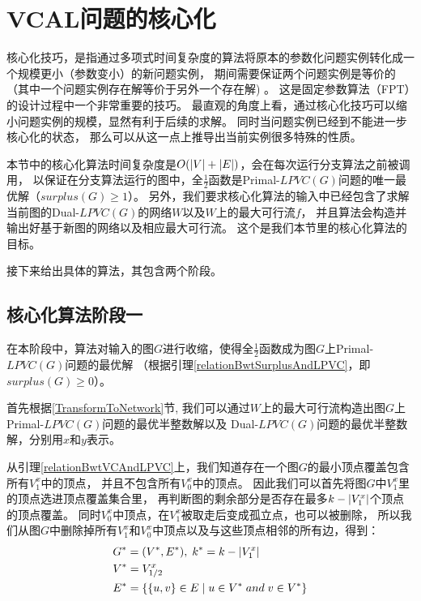 

\section{VCAL问题的核心化} \label{KerneliseAlgorithm}
核心化技巧，是指通过多项式时间复杂度的算法将原本的参数化问题实例转化成一个规模更小（参数变小）的新问题实例，
期间需要保证两个问题实例是等价的（其中一个问题实例存在解等价于另外一个存在解) 。
这是固定参数算法（FPT）的设计过程中一个非常重要的技巧。
最直观的角度上看，通过核心化技巧可以缩小问题实例的规模，显然有利于后续的求解。
同时当问题实例已经到不能进一步核心化的状态，
那么可以从这一点上推导出当前实例很多特殊的性质。

本节中的核心化算法时间复杂度是$O(\left\vert V \right\vert + \left\vert E \right\vert)$，会在每次运行分支算法之前被调用，
以保证在分支算法运行的图中，全$\frac{1}{2}$函数是Primal-$LPVC(G)$问题的唯一最优解（$surplus(G) \ge 1$）。
另外，我们要求核心化算法的输入中已经包含了求解当前图的Dual-$LPVC(G)$的网络$W$以及$W$上的最大可行流$f$，
并且算法会构造并输出好基于新图的网络以及相应最大可行流。
这个是我们本节里的核心化算法的目标。

接下来给出具体的算法，其包含两个阶段。

\subsection{核心化算法阶段一}
在本阶段中，算法对输入的图$G$进行收缩，使得全$\frac{1}{2}$函数成为图$G$上Primal-$LPVC(G)$问题的最优解
（根据引理\ref{relationBwtSurplusAndLPVC}，即$surplus(G) \ge 0$）。
\vspace{0.5cm}

首先根据\ref{TransformToNetwork}节, 我们可以通过$W$上的最大可行流构造出图$G$上Primal-$LPVC(G)$问题的最优半整数解以及
Dual-$LPVC(G)$问题的最优半整数解，分别用$x$和$y$表示。

从引理\ref{relationBwtVCAndLPVC}上，我们知道存在一个图$G$的最小顶点覆盖包含所有$V^x_1$中的顶点，
并且不包含所有$V^x_0$中的顶点。
因此我们可以首先将图$G$中$V^x_1$里的顶点选进顶点覆盖集合里，
再判断图的剩余部分是否存在最多$k - \left\vert V^x_1 \right\vert$个顶点的顶点覆盖。
同时$V^x_0$中顶点，在$V^x_1$被取走后变成孤立点，也可以被删除，
所以我们从图$G$中删除掉所有$V^x_1$和$V^x_0$中顶点以及与这些顶点相邻的所有边，得到：
\begin{equation*}\begin{aligned}
    &G^* = (V^*, E^*),\;k^* = k - \left\vert V^x_1 \right\vert \\
    &V^* = V^x_{1/2} \\
    &E^* = \{\{u, v\} \in E\;|\;u \in V^*\;and\;v\in V^*\}
\end{aligned}\end{equation*}

